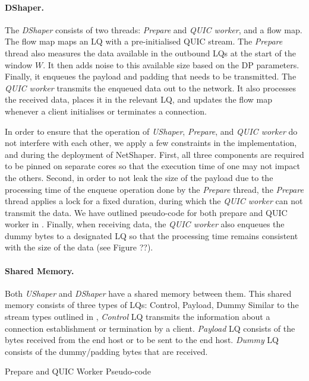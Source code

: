 \paragraph{DShaper.}
The \textit{DShaper} consists of two threads: \textit{Prepare} and \textit{QUIC worker}, and a flow map.
The flow map maps an LQ with a pre-initialised QUIC stream.
The \textit{Prepare} thread also measures the data available in the outbound LQs at the start of the window $W$.
It then adds noise to this available size based on the DP parameters.
Finally, it enqueues the payload and padding that needs to be transmitted.
The \textit{QUIC worker} transmits the enqueued data out to the network.
It also processes the received data, places it in the relevant LQ, and updates the flow map whenever a client initialises or terminates a connection.

In order to ensure that the operation of \textit{UShaper}, \textit{Prepare}, and \textit{QUIC worker} do not interfere with each other, we apply a few constraints in the implementation, and during the deployment of NetShaper.
First, all three components are required to be pinned on separate cores so that the execution time of one may not impact the others.
Second, in order to not leak the size of the payload due to the processing time of the enqueue operation done by the \textit{Prepare} thread, the \textit{Prepare} thread applies a lock for a fixed duration, during which the \textit{QUIC worker} can not transmit the data. 
We have outlined pseudo-code for both prepare and QUIC worker in .
Finally, when receiving data, the \textit{QUIC worker} also enqueues the dummy bytes to a designated LQ so that the processing time remains consistent with the size of the data (see Figure ??).

\paragraph{Shared Memory.}
Both \textit{UShaper} and \textit{DShaper} have a shared memory between them.
This shared memory consists of three types of LQs: Control, Payload, Dummy
Similar to the stream types outlined in , \textit{Control} LQ transmits the information about a connection establishment or termination by a client. 
\textit{Payload} LQ consists of the bytes received from the end host or to be sent to the end host.
\textit{Dummy} LQ consists of the dummy/padding bytes that are received.

\begin{minipage}{\textwidth}

\captionsetup{type=lstlisting}
\caption{Prepare and QUIC Worker Pseudo-code}
\label{lst:prepare_and_worker}
\end{minipage}

